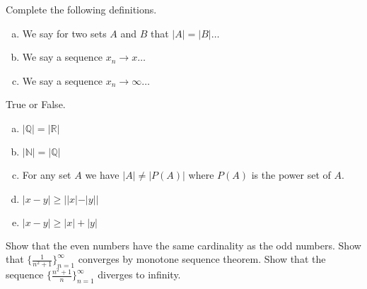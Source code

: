 \documentclass[11pt]{exam}
\theoremstyle{definition}
\begin{document}
\begin{questions}
\question Complete the following definitions. 
\begin{enumerate}[(a)]
\item We say for two sets $A$ and $B$ that $|A|=|B|\ldots $
\item We say a sequence $x_n\rightarrow x\ldots$ 
\item We say a sequence $x_n\rightarrow \infty\ldots $
\end{enumerate}
\vfill
\question True or False. 
\begin{enumerate}[(a)]
\item $|\mathbb{Q}|=|\mathbb{R}|$
\item $|\mathbb{N}|=|\mathbb{Q}|$
\item For any set $A$ we have $|A|\neq |P(A)|$ where $P(A)$ is the power set of $A$. 
\item $|x-y|\geq ||x|-|y||$
\item $|x-y|\geq |x|+|y|$
\end{enumerate}
\vspace{1.5in}
\newpage 
\question Show that the even numbers have the same cardinality as the odd numbers.  
\newpage
\question Show that $\{\frac{1}{n^2+1}\}_{n=1}^\infty$ converges by monotone sequence theorem. 
\newpage
\question Show that the sequence $\{\frac{n^2+1}{n}\}_{n=1}^\infty$ diverges to infinity.
\end{questions}
\end{document}
